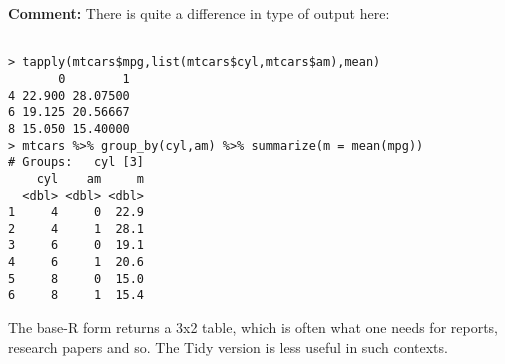 \documentclass[11pt]{article}
\begin{document}
\begin{parcolumns}[rulebetween=true]{2}


\hspace{0.1in}


\end{parcolumns}

\textbf{Comment:}  There is quite a difference in type of output here:

\begin{lstlisting}

> tapply(mtcars$mpg,list(mtcars$cyl,mtcars$am),mean)
       0        1
4 22.900 28.07500
6 19.125 20.56667
8 15.050 15.40000
> mtcars %>% group_by(cyl,am) %>% summarize(m = mean(mpg))
# Groups:   cyl [3]
    cyl    am     m
  <dbl> <dbl> <dbl>
1     4     0  22.9
2     4     1  28.1
3     6     0  19.1
4     6     1  20.6
5     8     0  15.0
6     8     1  15.4

\end{lstlisting}

The base-R form returns a 3x2 table, which is often what one needs for
reports, research papers and so.  The Tidy version is less useful in
such contexts.
\end{document}
